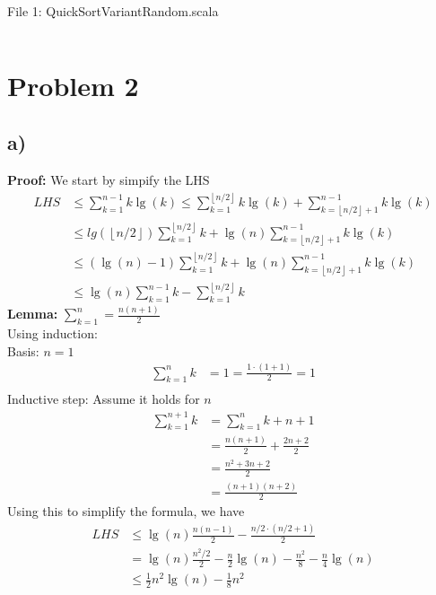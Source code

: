 \documentclass{article}
\providecommand{\floorfunc}[1]{\left \lfloor #1 \right \rfloor }
\begin{document}
File 1: QuickSortVariantRandom.scala
\inputminted{Scala}{QuickSort/src/main/scala/QuickSortVariantRandom.scala}

\section*{Problem 2}
\subsection*{a)}
\textbf{Proof:} We start by simpify the LHS
\begin{align*}
    LHS &\leq \sum_{k = 1}^{n - 1} k \lg(k) \leq
    \sum_{k = 1}^{\floorfunc{n / 2}} k \lg(k) +
    \sum_{k = \floorfunc{n / 2} + 1}^{n - 1} k \lg(k) \\
    &\leq lg(\floorfunc{n / 2}) \sum_{k = 1}^{\floorfunc{n / 2}} k  +
    \lg(n) \sum_{k = \floorfunc{n / 2} + 1}^{n - 1} k \lg(k) \\
    &\leq (\lg(n) - 1) \sum_{k = 1}^{\floorfunc{n / 2}} k  +
    \lg(n) \sum_{k = \floorfunc{n / 2} + 1}^{n - 1} k \lg(k) \\
    &\leq \lg(n) \sum_{k = 1}^{n - 1} k -  \sum_{k = 1}^{\floorfunc{n / 2}} k
\end{align*}
\textbf{Lemma:} $\sum_{k = 1}^{n} = \frac{n(n + 1)}{2} $ \\
Using induction: \\
Basis: $ n = 1 $
\begin{align*}
    \sum_{k = 1}^{n} k  &= 1 = \frac{1 \cdot (1 + 1)}{2} = 1 \\
\end{align*}
Inductive step: Assume it holds for $n$
\begin{align*}
    \sum_{k = 1}^{n + 1} k &= \sum_{k = 1}^{n} k + n  + 1\\
    &= \frac{n(n+1)}{2} + \frac{2n + 2}{2} \\
    &= \frac{n^2 + 3n + 2}{2} \\
    &= \frac{(n + 1)(n + 2)}{2}
\end{align*}
Using this to simplify the formula, we have
\begin{align*}
    LHS &\leq \lg(n) \frac{n(n - 1)}{2} - \frac{n/2 \cdot (n/2 + 1)}{2} \\
    &= \lg(n) \frac{n^2 / 2}{2} - \frac{n}{2} \lg(n)
    -\frac{n^2}{8} - \frac{n}{4} \lg(n) \\
    &\leq \frac{1}{2} n^2 \lg(n) - \frac{1}{8} n^2
\end{align*}
\end{document}
